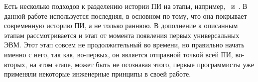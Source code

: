 Есть несколько подходов к разделению истории ПИ на этапы, например,~\cite{Glass} и~\cite{Aguila:2014:MSE}. В данной работе используется последняя, в основном по тому, что она покрывает современную историю ПИ, а не только раннюю. В дополнение к описанным этапам рассмотривается и этап от момента появления первых универсальных ЭВМ. Этот этап совсем не продолжительный во времени, но правильно начать именно с него, так как, во-первых, он является отправной точкой всей ПИ, во-вторых, на этом этапе, может быть не осознавая этого, первые программисты уже применяли некоторые инженерные принципы в своей работе.
